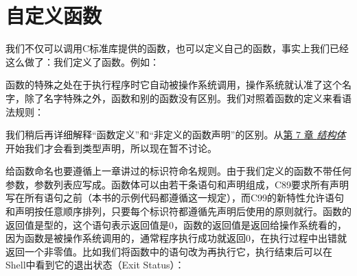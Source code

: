 


\section{自定义函数}
%
我们不仅可以调用C标准库提供的函数，也可以定义自己的函数，事实上我们已经这么做了：我们定义了函数。例如：




函数的特殊之处在于执行程序时它自动被操作系统调用，操作系统就认准了这个名字，除了名字特殊之外，函数和别的函数没有区别。我们对照着函数的定义来看语法规则：


\begin{BookLiteral}
\end{BookLiteral}


我们稍后再详细解释“函数定义”和“非定义的函数声明”的区别。从\hyperlink{db.ch07.id2730134}{第 7 章 \emph{结构体}}开始我们才会看到类型声明，所以现在暂不讨论。



给函数命名也要遵循上一章讲过的标识符命名规则。由于我们定义的函数不带任何参数，参数列表应写成。函数体可以由若干条语句和声明组成，C89要求所有声明写在所有语句之前（本书的示例代码都遵循这一规定），而C99的新特性允许语句和声明按任意顺序排列，只要每个标识符都遵循先声明后使用的原则就行。函数的返回值是型的，这个语句表示返回值是0，函数的返回值是返回给操作系统看的，因为函数是被操作系统调用的，通常程序执行成功就返回0，在执行过程中出错就返回一个非零值。比如我们将函数中的语句改为再执行它，执行结束后可以在Shell中看到它的退出状态（Exit Status）：



